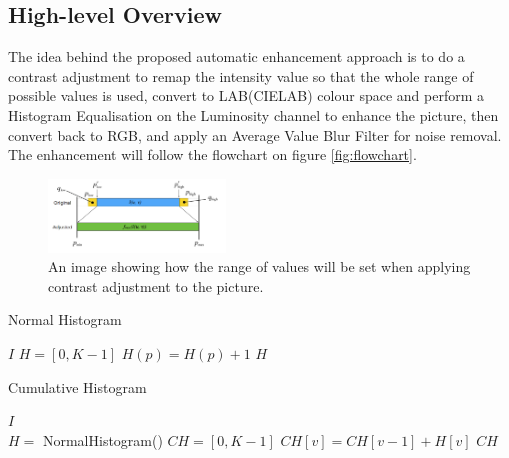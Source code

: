 \documentclass[journal,transmag]{IEEEtran}
\begin{document}
\subsection{High-level Overview}
The idea behind the proposed automatic enhancement approach is to do a contrast adjustment to remap the intensity value so that the whole range of possible values is used, convert to LAB(CIELAB) colour space and perform a Histogram Equalisation on the Luminosity channel to enhance the picture, then convert back to RGB, and apply an Average Value Blur Filter for noise removal. The enhancement will follow the flowchart on figure \ref{fig:flowchart}.

\begin{figure}[h!]
\centering
\includegraphics[width=0.42\textwidth]{figures/contrAdj.png}
\caption{An image showing how the range of values will be set when applying contrast adjustment to the picture.}
\label{fig:contrAdj}
\end{figure}

\begin{algorithm}[bh!] %
	\caption{Normal Histogram}
	\label{alg:norm_hist}
	\begin{algorithmic}[1]
		 {$I$}
		\State
		\State $H = [0, K-1]$
		\State 
		\State $H(p) = H(p) + 1$
		\EndFor
		\State 
		\State
		\Return $H$
		\EndFunction
	\end{algorithmic}
\end{algorithm}
\begin{algorithm}[bh!]%
	\caption{Cumulative Histogram}
	\label{alg:cum_hist}
	\begin{algorithmic}[1]
		 {$I$}\\ 
		\State
		\State $H = $ NormalHistogram()
		\State $CH = [0, K-1]$
		\State
		\State $CH[v] = CH[v-1] + H[v]$
		\EndFor
		\State 
		\State
		\Return $CH$
		\EndFunction
	\end{algorithmic}
\end{algorithm}
\end{document}
